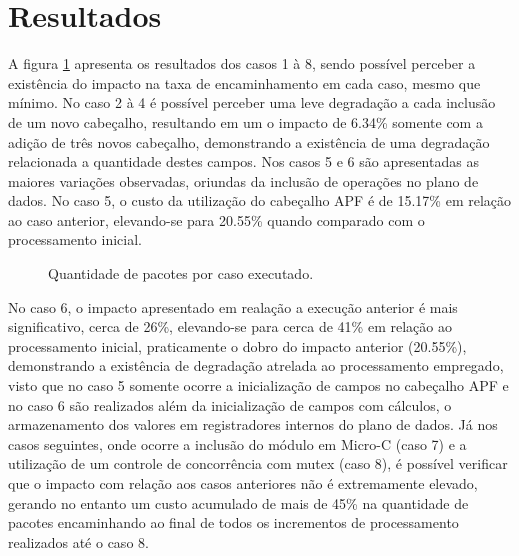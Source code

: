 \documentclass[12pt]{article}
\begin{document}
\section{Resultados} \label{sec:resultados}

A figura \ref{fig:casos_grafico} apresenta os resultados dos casos 1 à 8, sendo possível perceber a existência do impacto na taxa de encaminhamento em cada caso, mesmo que mínimo. No caso 2 à 4 é possível perceber uma leve degradação a cada  inclusão de um novo cabeçalho, resultando em um o impacto de 6.34\% somente com a adição de três novos cabeçalho, demonstrando a existência de uma degradação relacionada a quantidade destes campos. Nos casos 5 e 6 são apresentadas as maiores variações observadas, oriundas da inclusão de operações no plano de dados. No caso 5, o custo da utilização do cabeçalho APF é de 15.17\% em relação ao caso anterior, elevando-se para 20.55\% quando comparado com o processamento inicial.

\begin{figure}[!htb]
\centering
{}
\caption{Quantidade de pacotes por caso executado.}
\label{fig:casos_grafico}
\end{figure}

No caso 6, o impacto apresentado em realação a execução anterior é  mais significativo, cerca de 26\%, elevando-se para cerca de 41\% em relação ao processamento inicial, praticamente o dobro do impacto anterior (20.55\%), demonstrando a existência de degradação atrelada ao processamento empregado, visto que no caso 5 somente ocorre a inicialização de campos no cabeçalho APF e no caso 6 são realizados além da inicialização de campos com cálculos, o armazenamento dos valores em registradores internos do plano de dados. Já nos casos seguintes, onde ocorre a inclusão do módulo em Micro-C (caso 7) e a utilização de um controle de concorrência com mutex (caso 8), é possível verificar que o impacto com relação aos casos anteriores não é extremamente elevado, gerando no entanto um custo acumulado de mais de 45\% na quantidade de pacotes encaminhando ao final de todos os incrementos de processamento realizados até o caso 8.
\end{document}

